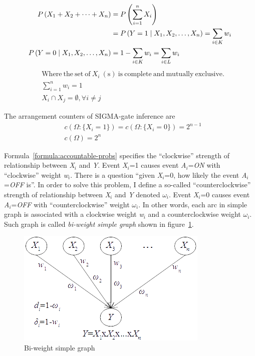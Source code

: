 \documentclass{article}
\numberwithin{equation}{section}
\numberwithin{figure}{section}
\numberwithin{table}{section}
\begin{document}
\begin{equation}
\begin{split}
P\left(X_1+X_2+\dots +X_n\right)&=P\left(\sum^n_{i=1}{X_i}\right)\\
&=P\left(Y=1\mathrel{\left|\vphantom{Y=1 X_1,X_2,\dots ,X_n}\right.\kern-\nulldelimiterspace}X_1,X_2,\dots ,X_n\right)=\sum_{i\in K}{w_i}\\
P\left(Y=0\mathrel{\left|\vphantom{Y=0 X_1,X_2,\dots ,X_n}\right.\kern-\nulldelimiterspace}X_1,X_2,\dots ,X_n\right)&=1-\sum_{i\in K}{w_i}=\sum_{i\in L}{w_i}
\end{split}
\label{sigma-gate-inference}
\end{equation}
\begin{align*}
&\mathrm{Where}\ \mathrm{the}\ \mathrm{set}\ \mathrm{of}\ X_i\ \left(\mathrm{s}\right)\ \mathrm{is}\ \mathrm{complete}\ \mathrm{and}\ \mathrm{mutually}\ \mathrm{exclusive.}\\
&\sum^n_{i=1}{w_i}=1\\
&X_i\cap X_j=\emptyset ,\forall i\neq j
\end{align*}

\noindent The arrangement counters of SIGMA-gate inference are
\begin{align*}
&c\left(\Omega:\{X_i=1\}\right)=c\left(\Omega:\{X_i=0\}\right)=2^{n-1}\\
&c\left(\Omega\right)=2^n
\end{align*}

Formula~\ref{formula:accountable-probs} specifies the ``clockwise'' strength of relationship between \textit{X${}_{i}$} and \textit{Y}. Event \textit{X${}_{i}$}=1 causes event \textit{A${}_{i}$}=\textit{ON} with ``clockwise'' weight \textit{w${}_{i}$}. There is a question ``given \textit{X${}_{i}$}=0, how likely the event \textit{A${}_{i}$}=\textit{OFF} is''. In order to solve this problem, I define a so-called ``counterclockwise'' strength of relationship between \textit{X${}_{i}$} and \textit{Y} denoted \textit{$\omega$${}_{i}$}. Event \textit{X${}_{i}$}=0 causes event \textit{A${}_{i}$}=\textit{OFF} with ``counterclockwise'' weight \textit{$\omega$${}_{i}$}. In other words, each arc in simple graph is associated with a clockwise weight \textit{w${}_{i}$} and a counterclockwise weight \textit{$\omega$${}_{i}$}. Such graph is called \textit{bi-weight simple graph} shown in figure~\ref{figure:biweight-simple-graph}.

\begin{figure}
\centering
\includegraphics{BiweightSimpleGraph.png}
\caption{Bi-weight simple graph}
\label{figure:biweight-simple-graph}
\end{figure}
\end{document}
